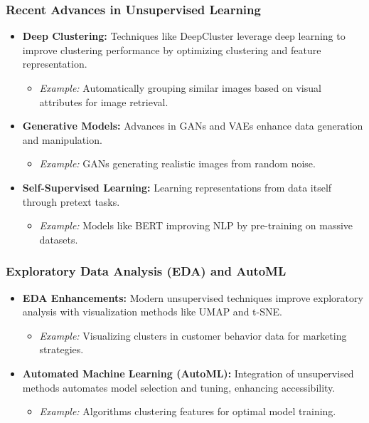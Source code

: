 \documentclass[aspectratio=169]{beamer}
\begin{document}
\begin{frame}[fragile]
    \frametitle{Recent Advances in Unsupervised Learning}
    \begin{itemize}
        \item \textbf{Deep Clustering:} Techniques like DeepCluster leverage deep learning to improve clustering performance by optimizing clustering and feature representation.
            \begin{itemize}
                \item \textit{Example:} Automatically grouping similar images based on visual attributes for image retrieval.
            \end{itemize}
        \item \textbf{Generative Models:} Advances in GANs and VAEs enhance data generation and manipulation.
            \begin{itemize}
                \item \textit{Example:} GANs generating realistic images from random noise.
            \end{itemize}
        \item \textbf{Self-Supervised Learning:} Learning representations from data itself through pretext tasks.
            \begin{itemize}
                \item \textit{Example:} Models like BERT improving NLP by pre-training on massive datasets.
            \end{itemize}
    \end{itemize}
\end{frame}

\begin{frame}[fragile]
    \frametitle{Exploratory Data Analysis (EDA) and AutoML}
    \begin{itemize}
        \item \textbf{EDA Enhancements:} Modern unsupervised techniques improve exploratory analysis with visualization methods like UMAP and t-SNE.
            \begin{itemize}
                \item \textit{Example:} Visualizing clusters in customer behavior data for marketing strategies.
            \end{itemize}
        \item \textbf{Automated Machine Learning (AutoML):} Integration of unsupervised methods automates model selection and tuning, enhancing accessibility.
            \begin{itemize}
                \item \textit{Example:} Algorithms clustering features for optimal model training.
            \end{itemize}
    \end{itemize}
\end{frame}
\end{document}
